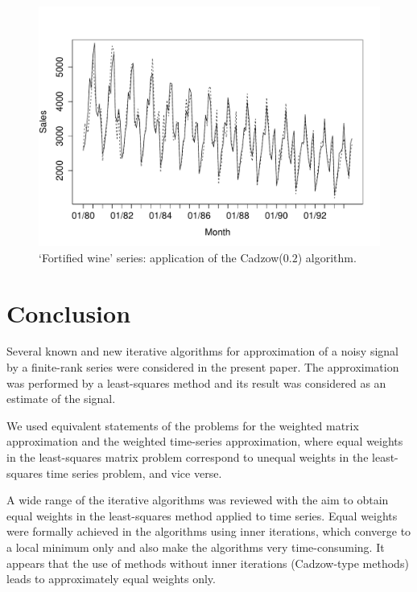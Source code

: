 \documentclass[sii]{ipart}
\begin{document}
\begin{figure}[!hhh]
	\includegraphics[width = \columnwidth]{rlimage.pdf}
	\caption{`Fortified wine' series: application of the Cadzow($0.2$) algorithm.}
	\label{fig:rl}
\end{figure}

\section{Conclusion}
\label{sec:concl}

Several known and new iterative algorithms for approximation of a noisy signal by a finite-rank series were considered in the present paper. The approximation was performed by a least-squares method and its result was considered as an estimate of the signal.

 We used equivalent statements of the problems for the weighted matrix approximation and  the weighted time-series approximation, where equal weights in the least-squares matrix problem correspond
 to unequal weights in the least-squares time series problem, and vice verse.

A wide range of the iterative algorithms was reviewed with the aim to obtain equal weights in the least-squares method applied to time series.
Equal weights were formally achieved in the algorithms using inner iterations, which converge to a local minimum only and also make the algorithms very time-consuming. It appears that the use of methods without inner iterations (Cadzow-type methods) leads to approximately equal weights only.
\end{document}
